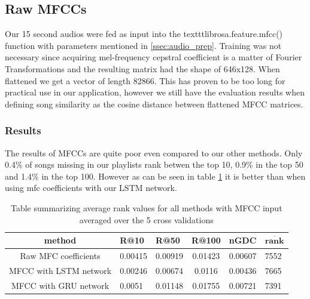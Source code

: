 \subsection{Raw MFCCs}
Our 15 second audios were fed as input into the texttt{librosa.feature.mfcc()} function with parameters mentioned in \ref{ssec:audio_prep}. Training was not necessary since acquiring mel-frequency cepstral coefficient is a matter of Fourier Transformations and the resulting matrix had the shape of 646x128. When flattened we get a vector of length 82866. This has proven to be too long for practical use in our application, however we still have the evaluation results when defining song similarity as the cosine distance between flattened MFCC matrices.

\subsubsection{Results}

The results of MFCCs are quite poor even compared to our other methods. Only 0.4\% of songs missing in our playlists rank betwen the top 10, 0.9\% in the top 50 and 1.4\% in the top 100. However as can be seen in table \ref{table:mfcc_methods} it is better than when using mfc coefficients with our LSTM network.
\begin{table}[h!]
\centering
\renewcommand{\arraystretch}{1.5}
\begin{tabu} to 1\textwidth { | c || X[c] | X[c] | c | X[c] | X[c] |}
 \hline
 \textbf{method} & \textbf{R@10} & \textbf{R@50} & \textbf{R@100} & \textbf{nGDC} & $ \boldsymbol{\overline{rank}} $ \\
 \hline
 \hline
 Raw MFC coefficients & 0.00415 & 0.00919 & 0.01423 & 0.00607 &  7552 \\
 \hline
 MFCC with LSTM network & 0.00246 & 0.00674 & 0.0116 & 0.00436 & 7665 \\
 \hline
 MFCC with GRU network & 0.0051 & 0.01148 & 0.01755 & 0.00721 & 7391 \\
 \hline
\end{tabu} \\

\caption{Table summarizing average rank values for all methods with MFCC input averaged over the 5 cross validations}
\label{table:mfcc_methods}
\end{table}

